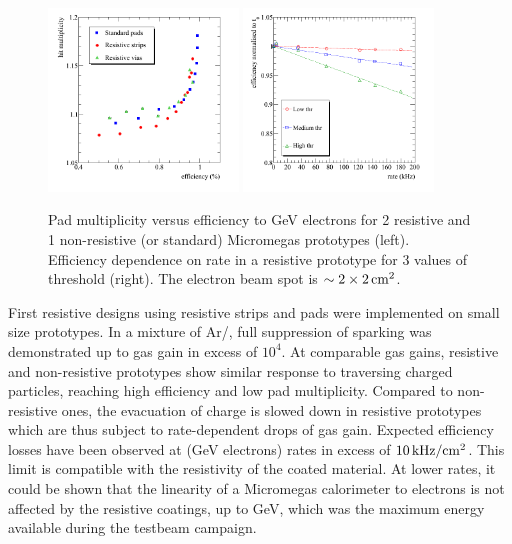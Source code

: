 \begin{figure}
\begin{centering}
\includegraphics[width=0.45\textwidth]{Calorimeter/SDHCAL/splam_eff}
\includegraphics[width=0.45\textwidth]{Calorimeter/SDHCAL/splam_rate}
\caption{Pad multiplicity versus efficiency to \unit[3]{GeV} electrons for 2 resistive and 1 non-resistive (or standard) Micromegas prototypes (left). Efficiency dependence on rate in a resistive prototype for 3 values of threshold (right). The electron beam spot is $\sim 2\times \unit[2]{cm^{2}}$.}
\label{resistive}
\end{centering}
\end{figure}

First resistive designs using resistive strips and pads were implemented on small size prototypes. In a mixture of Ar/, full suppression of sparking was demonstrated up to gas gain in excess of $10^{4}$. At comparable gas gains, resistive and non-resistive prototypes show similar response to traversing charged particles, reaching high efficiency and low pad multiplicity. Compared to non-resistive ones, the evacuation of charge is slowed down in resistive prototypes which are thus subject to rate-dependent drops of gas gain. Expected efficiency losses have been observed at (\unit[3]{GeV} electrons) rates in excess of $\unit[10]{kHz/cm^{2}}$. This limit is compatible with the resistivity of the coated material. At lower rates, it could be shown that the linearity of a Micromegas calorimeter to electrons is not affected by the resistive coatings, up to \unit[5]{GeV}, which was the maximum energy available during the testbeam campaign.

